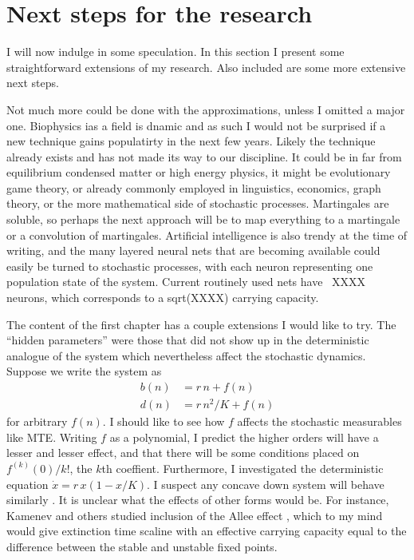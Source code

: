 \section{Next steps for the research}
I will now indulge in some speculation. 
In this section I present some straightforward extensions of my research. 
Also included are some more extensive next steps. 

Not much more could be done with the approximations, unless I omitted a major one. 
Biophysics ias a field is dnamic and as such I would not be surprised if a new technique gains populatirty in the next few years. 
Likely the technique already exists and has not made its way to our discipline. 
It could be in far from equilibrium condensed matter or high energy physics, it might be evolutionary game theory, or already commonly employed in linguistics, economics, graph theory, or the more mathematical side of stochastic processes. 
Martingales are soluble, so perhaps the next approach will be to map everything to a martingale or a convolution of martingales. 
Artificial intelligence is also trendy at the time of writing, and the many layered neural nets that are becoming available could easily be turned to stochastic processes, with each neuron representing one population state of the system. 
Current routinely used nets have ~XXXX neurons, which corresponds to a sqrt(XXXX) carrying capacity. 

The content of the first chapter has a couple extensions I would like to try. 
The ``hidden parameters'' were those that did not show up in the deterministic analogue of the system which nevertheless affect the stochastic dynamics. 
Suppose we write the system as
\begin{align*}
	b(n) &= r\,n + f(n) \\
	d(n) &= r\,n^2/K + f(n)
\end{align*}
for arbitrary $f(n)$. I should like to see how $f$ affects the stochastic measurables like MTE. 
Writing $f$ as a polynomial, I predict the higher orders will have a lesser and lesser effect, and that there will be some conditions placed on $f^{(k)}(0)/k!$, the $k$th coeffient. 
Furthermore, I investigated the deterministic equation $\dot{x} = r\,x(1-x/K)$. I suspect any concave down system will behave similarly \cite{Strogatz?}. 
It is unclear what the effects of other forms would be. 
For instance, Kamenev and others studied inclusion of the Allee effect \cite{Kamenev?}, which to my mind would give extinction time scaline with an effective carrying capacity equal to the difference between the stable and unstable fixed points. 

